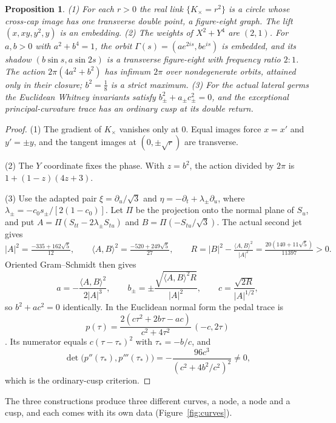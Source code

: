 \documentclass[11pt]{article}
\newtheorem{proposition}[theorem]{Proposition}
\theoremstyle{definition}\newtheorem{definition}[theorem]{Definition}
\theoremstyle{remark}\newtheorem{remark}[theorem]{Remark}
\begin{document}
\begin{proposition}\label{prop:curves}
(1) For each $r>0$ the real link $\{K_\times=r^2\}$ is a circle whose cross-cap
image has one transverse double point, a figure-eight graph. The lift
$(x,xy,y^2,y)$ is an embedding.
(2) The weights of $X^2+Y^4$ are $(2,1)$. For $a,b>0$ with $a^2+b^4=1$, the orbit
$\Gamma(s)=(ae^{2is},be^{is})$ is embedded, and its shadow $(b\sin s,a\sin2s)$
is a transverse figure-eight with frequency ratio $2:1$. The action
$2\pi(4a^2+b^2)$ has infimum $2\pi$ over nondegenerate orbits, attained only in
their closure; $b^2=\frac18$ is a strict maximum.
(3) For the actual lateral germs the Euclidean Whitney invariants satisfy
$b_\pm^2+a_\pm c_\pm^2=0$, and the exceptional principal-curvature trace has an
ordinary cusp at its double return.
\end{proposition}
\begin{proof}
(1) The gradient of $K_\times$ vanishes only at $0$. Equal images force $x=x'$
and $y'=\pm y$, and the tangent images at $(0,\pm\sqrt r)$ are transverse.

(2) The $Y$ coordinate fixes the phase. With $z=b^2$, the action divided by $2\pi$
is $1+(1-z)(4z+3)$.

(3) Use the adapted pair $\xi=\partial_u/\sqrt3$ and
$\eta=-\partial_t+\lambda_\pm\partial_u$, where $\lambda_\pm=-c_0s_\pm/[2(1-c_0)]$.
Let $\Pi$ be the projection onto the normal plane of $S_u$, and put
$A=\Pi(S_{tt}-2\lambda_\pm S_{tu})$ and $B=\Pi(-S_{tu}/\sqrt3)$. The actual
second jet gives
\[
 |A|^2=\tfrac{-335+162\sqrt5}{12},\qquad
 \langle A,B\rangle^2=\tfrac{-520+249\sqrt5}{27},\qquad
 R=|B|^2-\tfrac{\langle A,B\rangle^2}{|A|^2}=\tfrac{20(140+11\sqrt5)}{11397}>0.
\]
Oriented Gram--Schmidt then gives
\[
 a=-\frac{\langle A,B\rangle^2}{2|A|^3},\qquad
 b_\pm=\pm\frac{\sqrt{\langle A,B\rangle^2R}}{|A|^2},\qquad
 c=\frac{\sqrt{2R}}{|A|^{1/2}},
\]
so $b^2+ac^2=0$ identically. In the Euclidean normal form the pedal trace is
\[
 p(\tau)=\frac{2(c\tau^2+2b\tau-ac)}{c^2+4\tau^2}\,(-c,2\tau)
\]
\cite[Prop.~2.1, Eq.~(2.8)]{principal}. Its numerator equals
$c(\tau-\tau_*)^2$ with $\tau_*=-b/c$, and
\[
 \det\bigl(p''(\tau_*),p'''(\tau_*)\bigr)=-\frac{96c^3}{(c^2+4b^2/c^2)^2}\neq0,
\]
which is the ordinary-cusp criterion.
\end{proof}
The three constructions produce three different curves, a node, a node and a
cusp, and each comes with its own data (Figure~\ref{fig:curves}).
\end{document}
